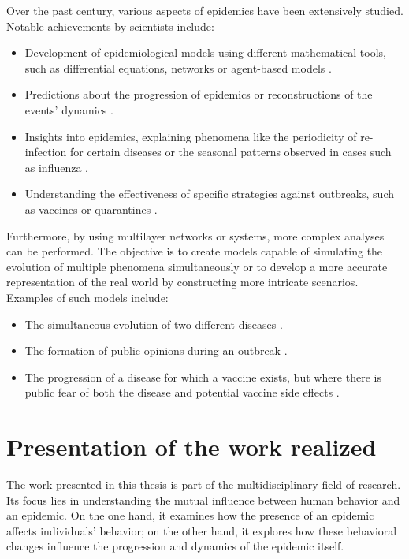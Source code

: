 Over the past century, various aspects of epidemics have been extensively studied. Notable achievements by scientists include:
\begin{itemize}
	\item Development of epidemiological models using different mathematical tools, such as differential equations, networks or agent-based models \cite{Hernandez_Vargas_2022, Keeling_2005}.
	\item Predictions about the progression of epidemics or reconstructions of the events' dynamics \cite{diekmann2000mathematical, brauer2012mathematical, Ledder_2023}.
	\item Insights into epidemics, explaining phenomena like the periodicity of re-infection for certain diseases or the seasonal patterns observed in cases such as influenza \cite{Bjoernstad2016}.
	\item Understanding the effectiveness of specific strategies against outbreaks, such as vaccines or quarantines \cite{Wang_2015_review}.
\end{itemize}
Furthermore, by using multilayer networks or systems, more complex analyses can be performed. The objective is to create models capable of simulating the evolution of multiple phenomena simultaneously or to develop a more accurate representation of the real world by constructing more intricate scenarios. Examples of such models include:
\begin{itemize}
	\item The simultaneous evolution of two different diseases \cite{DeDomenico2016}.
	\item The formation of public opinions during an outbreak \cite{teslya2022}.
	\item The progression of a disease for which a vaccine exists, but where there is public fear of both the disease and potential vaccine side effects \cite{Epstein_2021}.
\end{itemize}

\section{Presentation of the work realized}
The work presented in this thesis is part of the multidisciplinary field of research. Its focus lies in understanding the mutual influence between human behavior and an epidemic. On the one hand, it examines how the presence of an epidemic affects individuals' behavior; on the other hand, it explores how these behavioral changes influence the progression and dynamics of the epidemic itself.

